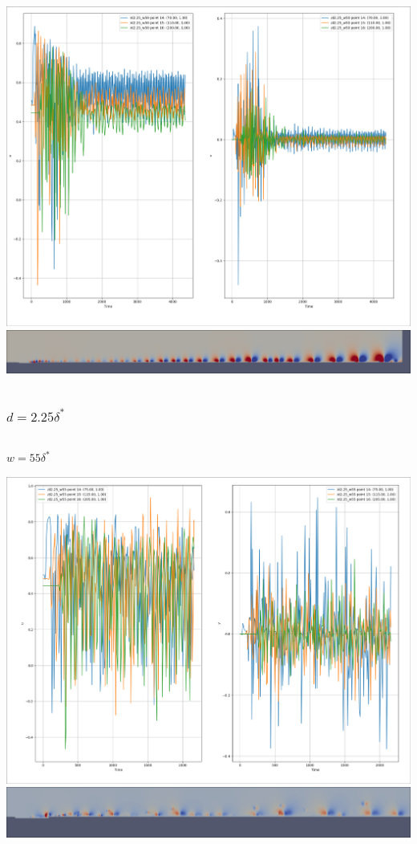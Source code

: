 \documentclass[
  aspectratio=169, %
  t, %
  onlytextwidth, %
  10pt, %
]{beamer}
\begin{document}
\begin{frame}
\begin{columns}[T]
\begin{column}{0.45\linewidth}
			\includegraphics[width=\textwidth]{Images/d2.25_w50.png}
			\includegraphics[width=\textwidth]{Images/d2.25_w50_dom.png}
		\end{column}
	\end{columns}
\end{frame}
\begin{frame}
	\frametitle{$d=2.25\delta^*$}
	
	\centering
	\begin{columns}[T] %
		\begin{column}{0.45\linewidth} %
			$w=55\delta^*$

			\includegraphics[width=\textwidth]{Images/d2.25_w55.png}
			\includegraphics[width=\textwidth]{Images/d2.25_w55_dom.png}
		\end{column}
	\end{columns}
\end{frame}
\end{document}
